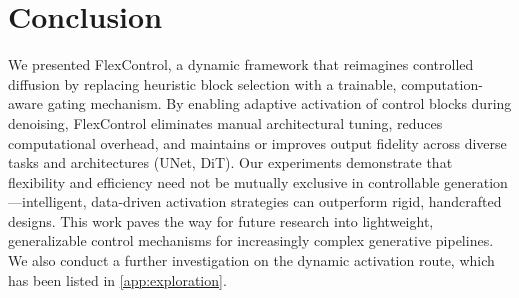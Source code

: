 \section{Conclusion}

We presented FlexControl, a dynamic framework that reimagines controlled diffusion by replacing heuristic block selection with a trainable, computation-aware gating mechanism. By enabling adaptive activation of control blocks during denoising, FlexControl eliminates manual architectural tuning, reduces computational overhead, and maintains or improves output fidelity across diverse tasks and architectures (UNet, DiT). Our experiments demonstrate that flexibility and efficiency need not be mutually exclusive in controllable generation—intelligent, data-driven activation strategies can outperform rigid, handcrafted designs. This work paves the way for future research into lightweight, generalizable control mechanisms for increasingly complex generative pipelines. We also conduct a further investigation on the dynamic activation route, which has been listed in \cref{app:exploration}.
